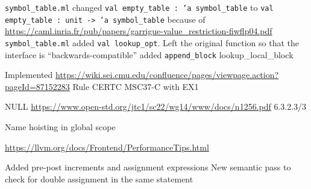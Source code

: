 
\texttt{symbol_table.ml} changed \texttt{val empty_table : 'a symbol_table} to \texttt{val empty_table : unit -> 'a symbol_table} because of \url{https://caml.inria.fr/pub/papers/garrigue-value_restriction-fiwflp04.pdf}
\texttt{symbol_table.ml} added \texttt{val lookup_opt}. Left the original function so that the interface is ``backwards-compatible''
added \texttt{append_block}
lookup_local_block

Implemented \url{https://wiki.sei.cmu.edu/confluence/pages/viewpage.action?pageId=87152283} Rule CERTC MSC37-C with EX1

NULL \url{https://www.open-std.org/jtc1/sc22/wg14/www/docs/n1256.pdf} 6.3.2.3/3

Name hoisting in global scope

\url{https://llvm.org/docs/Frontend/PerformanceTips.html}


Added pre-post increments and assignment expressions
New semantic pass to check for double assignment in the same statement